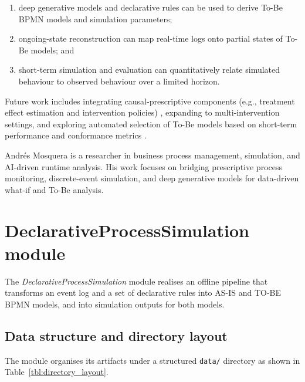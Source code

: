 \documentclass[a4paper,fleqn]{cas-sc}
\begin{document}
\begin{enumerate}
  \item deep generative models and declarative rules can be
  used to derive To-Be BPMN models and simulation parameters;
  \item ongoing-state reconstruction can map real-time logs
  onto partial states of To-Be models; and
  \item short-term simulation and evaluation can 
  quantitatively relate simulated behaviour to observed
  behaviour over a limited horizon.
\end{enumerate}

Future work includes integrating causal-prescriptive components
(e.g., treatment effect estimation and intervention policies) \citep{Shoush2025IS,Shoush2024arXiv},
expanding to multi-intervention settings, and exploring
automated selection of To-Be models based on short-term
performance and conformance metrics \citep{Middelhuis2025IS}.

\printcredits





\bio{}
Andr\'es Mosquera is a researcher in business process management,
simulation, and AI-driven runtime analysis. His work focuses on
bridging prescriptive process monitoring, discrete-event simulation,
and deep generative models for data-driven what-if and To-Be analysis.
\endbio

\clearpage

\appendix

\section{DeclarativeProcessSimulation module}
\label{app:declarative_module}

The \emph{DeclarativeProcessSimulation} module realises an
offline pipeline that transforms an event log and a set of
declarative rules into AS-IS and TO-BE BPMN models, and into
simulation outputs for both models.

\subsection{Data structure and directory layout}

The module organises its artifacts under a structured
\verb|data/| directory as shown in Table~\ref{tbl:directory_layout}.
\end{document}
